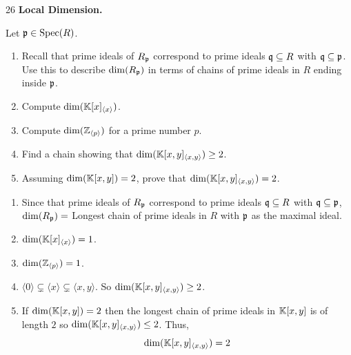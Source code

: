 \documentclass[Notebook.tex]{subfiles}
\begin{document}
\newpage 

\begin{problem}{26} \textbf{Local Dimension.} 

    Let $\operatorname{\mathfrak{p}}\in\operatorname{Spec}(R)$.
    \begin{enumerate}
        \item Recall that prime ideals of $R_{\operatorname{\mathfrak{p}}}$ correspond to prime ideals $\operatorname{\mathfrak{q}}\subseteq R$ with $\operatorname{\mathfrak{q}}\subseteq \operatorname{\mathfrak{p}}$. Use this to describe $\dim(R_{\operatorname{\mathfrak{p}}})$ in terms of chains of prime ideals in $R$ ending inside $\operatorname{\mathfrak{p}}$.
        \item Compute $\dim(\mathbb K[x]_{\langle x\rangle})$.
        \item Compute $\dim(\mathbb Z_{\langle p\rangle})$ for a prime number $p$.
        \item Find a chain showing that $\dim(\mathbb K[x,y]_{\langle x,y\rangle})\geq 2$.
        \item Assuming $\dim(\mathbb K[x,y])=2$, prove that $\dim(\mathbb K[x,y]_{\langle x,y\rangle})=2$.
    \end{enumerate}    
\end{problem}

\begin{solution}
    \bbni
    \begin{enumerate}
        \item Since that prime ideals of $R_{\operatorname{\mathfrak{p}}}$ correspond to prime ideals $\operatorname{\mathfrak{q}}\subseteq R$ with $\operatorname{\mathfrak{q}}\subseteq \operatorname{\mathfrak{p}}$, $\dim(R_{\operatorname{\mathfrak{p}}}) = $ Longest chain of prime ideals in $R$ with $\operatorname{\mathfrak{p}}$ as the maximal ideal. 
        
        \item $\dim(\mathbb K[x]_{\langle x \rangle}) = 1$. 
        
        \item $\dim(\mathbb Z_{\langle p \rangle}) = 1$.
        
        \item $ \langle 0 \rangle \subsetneq \langle x \rangle \subsetneq \langle x, y \rangle$. So $\dim(\mathbb K[x,y]_{\langle x,y\rangle})\geq 2$. 
        
        \item If $\dim(\mathbb K[x,y]) =2$ then the longest chain of prime ideals in $\mathbb K[x,y]$ is of length $2$ so $\dim(\mathbb K[x,y]_{\langle x,y\rangle})\leq 2$. Thus, 
        \[\dim(\mathbb K[x,y]_{\langle x,y\rangle})= 2\]
    \end{enumerate}
\end{solution}
\end{document}
